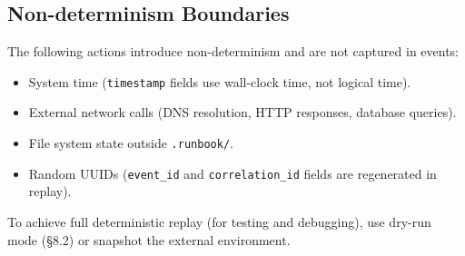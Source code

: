 \subsection{Non-determinism Boundaries}

The following actions introduce non-determinism and are not captured in events:
\begin{itemize}
  \item System time (\texttt{timestamp} fields use wall-clock time, not logical time).
  \item External network calls (DNS resolution, HTTP responses, database queries).
  \item File system state outside \texttt{.runbook/}.
  \item Random UUIDs (\texttt{event\_id} and \texttt{correlation\_id} fields are regenerated in replay).
\end{itemize}

To achieve full deterministic replay (for testing and debugging), use dry-run mode (§8.2) or snapshot the external environment.
